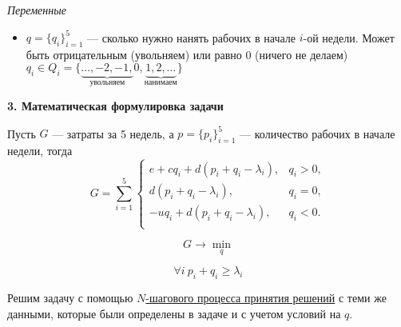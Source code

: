 \bigskip

\textit{Переменные}

\begin{itemize}[nosep]	
	\item $q = \{q_i\}_{i=1}^5$ --- сколько нужно нанять рабочих в начале $i$-ой недели. Может быть отрицательным (увольняем) или равно 0 (ничего не делаем) $q_i \in Q_i = \{\underbrace{\dots, -2, -1,}_{\text{увольняем}} 0, \underbrace{1, 2, \dots}_{\text{нанимаем}}\}$
\end{itemize}

\bigskip

\textbf{3. Математическая формулировка задачи}

Пусть $G$ --- затраты за 5 недель, а $p = \{p_i\}_{i=1}^5$ --- количество рабочих в начале недели, тогда
\[G = \sum_{i=1}^{5}  \begin{cases}
	e + cq_i + d(p_i + q_i - \lambda_i),& q_i > 0, \\
	d(p_i + q_i - \lambda_i),& q_i = 0, \\
	-uq_i + d(p_i + q_i - \lambda_i),& q_i < 0. \\
\end{cases}\]

\[G \to \min_{q}\]

\[\forall  i \ p_i + q_i \ge \lambda_i \tag{*}\]

\solution

Решим задачу с помощью \hyperref[def:n_step_process]{$N$-шагового процесса принятия решений} с теми же данными, которые были определены в задаче и с учетом условий на $q$.

\bigskip

